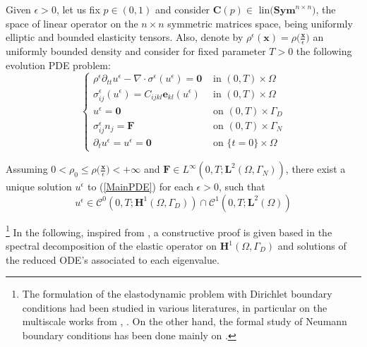 Given $\epsilon > 0$, let us fix $p \in (0,1)$ and consider $\mathbf{C}(p) \in \text{ lin}\big(\textbf{Sym}^{n\times n})$, the space of linear operator on the $n\times n$ symmetric matrices space, being uniformly elliptic and bounded elasticity tensors. Also, denote by $\rho^{\epsilon}(\mathbf{x}) = \rho \big( \frac{\mathbf{x}}{\epsilon}\big)$ an uniformly bounded density and consider for fixed parameter $T > 0$ the following evolution PDE problem:
\begin{equation}
    \label{MainPDE}
    \left \{
    \begin{array}{cc}
        \rho^{\epsilon} \partial_{tt} u^{\epsilon} - \nabla\cdot \sigma^{\epsilon}(u^{\epsilon})= \mathbf{0} & \text{ in } (0,T) \times \Omega \\
        \sigma^{\epsilon}_{ij}(u^{\epsilon}) = C_{ijkl} \mathbf{e}_{kl}(u^{\epsilon}) & \text{ in } (0,T)\times \Omega \\
        u^{\epsilon} = \mathbf{0} & \text{ on } (0,T) \times \Gamma_D \\
        \sigma^{\epsilon}_{ij} n_j = \mathbf{F} & \text{ on } (0,T) \times \Gamma_N \\
        \partial_t u^{\epsilon} = u^{\epsilon} = \mathbf{0} & \text{ on } \{t=0\} \times \Omega
    \end{array}
    \right.
\end{equation}
\begin{prop}
Assuming $0 < \rho_0 \leq \rho\big( \frac{\mathbf{x}}{\epsilon} \big) < + \infty$ and $\mathbf{F} \in L^{\infty}(0,T;\mathbf{L}^2(\Omega,\Gamma_N))$, there exist a unique solution $u^{\epsilon}$ to (\ref{MainPDE}) for each $\epsilon > 0$, such that
\begin{equation*}
    u^{\epsilon} \in \mathcal{C}^0(0,T;\mathbf{H}^1(\Omega,\Gamma_D)) \cap \mathcal{C}^1(0,T;\mathbf{L}^2(\Omega))
\end{equation*}
\end{prop}

\begin{rem}
\footnote{The formulation of the elastodynamic problem with Dirichlet boundary conditions had been studied in various literatures, in particular on the multiscale works from \cite{panasenko2005multi-scale}, \cite{bakhvalov1989homogenisation:}. On the other hand, the formal study of Neumann boundary conditions has been done mainly on \cite{oleinik1992mathematical}.} In the following, inspired from \cite{raviart1983introduction}, a constructive proof is given based in the spectral decomposition of the elastic operator on $\mathbf{H}^1(\Omega, \Gamma_D)$ and solutions of the reduced ODE's associated to each eigenvalue. %
\end{rem}


